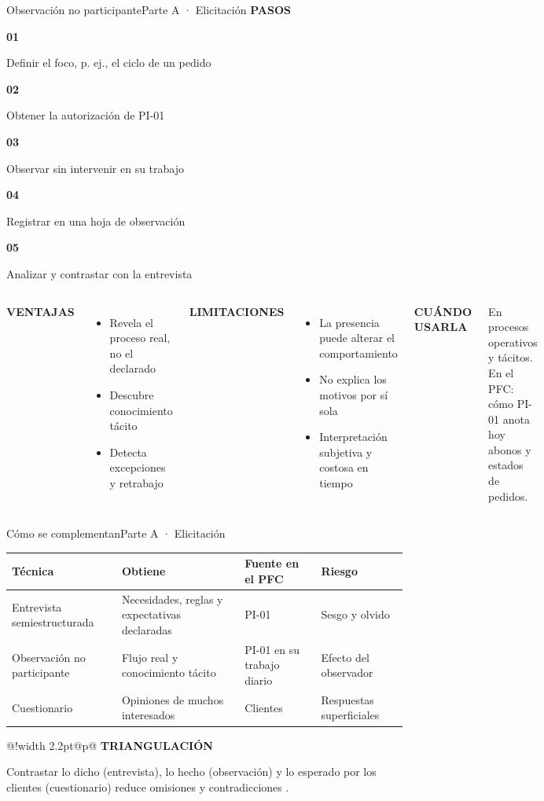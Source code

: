 \documentclass[aspectratio=169,11pt,t]{beamer}
\makeatletter
\newcommand{\etiqueta}[1]{{\color{acento}\scriptsize\bfseries\MakeUppercase{#1}}\par\vspace{3pt}}
\newcommand{\nota}[2]{\par\vspace{3pt}\noindent
	\begin{tabular}{@{}!{\color{acento}\vrule width 2.2pt}@{\hspace{8pt}}p{\dimexpr\linewidth-14pt\relax}@{}}
		{\color{acento}\scriptsize\bfseries\MakeUppercase{#1}}\par\vspace{1pt}#2
	\end{tabular}\par}
\newcommand{\paso}[2]{\parbox[t]{0.178\textwidth}{\raggedright\color{acento}\large\bfseries #1\par\vspace{2pt}\color{tinta}\scriptsize #2}}
\makeatother
\begin{document}
	\begin{frame}{Observación no participante}{Parte A · Elicitación}
		\etiqueta{Pasos}
		\noindent\paso{01}{Definir el foco, p. ej., el ciclo de un pedido}\hfill
		\paso{02}{Obtener la autorización de PI-01}\hfill
		\paso{03}{Observar sin intervenir en su trabajo}\hfill
		\paso{04}{Registrar en una hoja de observación}\hfill
		\paso{05}{Analizar y contrastar con la entrevista}
		\vspace{10pt}
		\begin{columns}[T]
			\etiqueta{Ventajas}
			\footnotesize\begin{itemize}
				\item Revela el proceso real, no el declarado
				\item Descubre conocimiento tácito
				\item Detecta excepciones y retrabajo
			\end{itemize}
			\etiqueta{Limitaciones}
			\footnotesize\begin{itemize}
				\item La presencia puede alterar el comportamiento
				\item No explica los motivos por sí sola
				\item Interpretación subjetiva y costosa en tiempo
			\end{itemize}
			\etiqueta{Cuándo usarla}
			\footnotesize En procesos operativos y tácitos. En el PFC: cómo PI-01 anota hoy abonos y estados de pedidos.
		\end{columns}
	\end{frame}
	
	\begin{frame}{Cómo se complementan}{Parte A · Elicitación}
		\small
		\renewcommand{\arraystretch}{1.2}
		\setlength{\tabcolsep}{5pt}
		\begin{tabular}{@{}p{3.0cm}p{3.7cm}p{3.1cm}p{2.7cm}@{}}
			\toprule
			{\color{acento}\bfseries Técnica} & {\color{acento}\bfseries Obtiene} & {\color{acento}\bfseries Fuente en el PFC} & {\color{acento}\bfseries Riesgo}\\
			\midrule
			Entrevista semiestructurada & Necesidades, reglas y expectativas declaradas & PI-01 & Sesgo y olvido\\
			Observación no participante & Flujo real y conocimiento tácito & PI-01 en su trabajo diario & Efecto del observador\\
			Cuestionario & Opiniones de muchos interesados & Clientes & Respuestas superficiales\\
			\bottomrule
		\end{tabular}
		\nota{Triangulación}{\small Contrastar lo dicho (entrevista), lo hecho (observación) y lo esperado por los clientes (cuestionario) reduce omisiones y contradicciones \cite{pacheco2018,canche2021,ireb2024}.}
	\end{frame}
	
\end{document}
